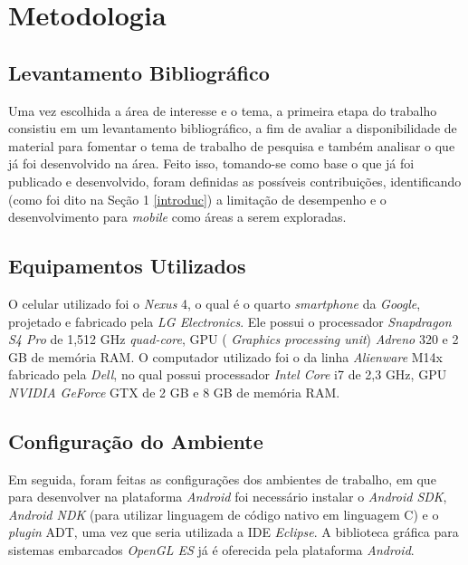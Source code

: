 \chapter[Metodologia]{Metodologia}

\section{Levantamento Bibliográfico}

Uma vez escolhida a área de interesse e o tema, a primeira etapa do trabalho consistiu em um levantamento bibliográfico, a fim de avaliar a disponibilidade de material para fomentar o tema de trabalho de pesquisa e também analisar o que já foi desenvolvido na área. Feito isso, tomando-se como base o que já foi publicado e desenvolvido, foram definidas as possíveis contribuições, identificando (como foi dito na Seção 1 \ref{introduc}) a limitação de desempenho e o desenvolvimento para \textit{mobile} como áreas a serem exploradas.  

\section{Equipamentos Utilizados}

O celular utilizado foi o \textit{Nexus} 4, o qual é o quarto  \textit{smartphone} da  \textit{Google}, projetado e fabricado pela \textit{LG Electronics}.  Ele possui o processador \textit{Snapdragon S4 Pro} de 1,512 GHz \textit{quad-core}, GPU ( \textit{Graphics processing unit}) \textit{Adreno} 320 e 2 GB de memória RAM. O computador utilizado foi o da linha \textit{Alienware} M14x fabricado pela \textit{Dell}, no qual possui processador \textit{Intel Core} i7 de 2,3 GHz, GPU \textit{NVIDIA GeForce} GTX de 2 GB e 8 GB de memória RAM. 

\section{Configuração do Ambiente}
\label{configamb}	

	Em seguida, foram feitas as configurações dos ambientes de trabalho, em que  para desenvolver na plataforma \textit{Android} foi necessário instalar o \textit{Android SDK}, \textit{Android NDK} (para utilizar linguagem de código nativo em linguagem C) e o \textit{plugin} ADT, uma vez que seria utilizada a IDE \textit{Eclipse}. A biblioteca gráfica para sistemas embarcados \textit{OpenGL ES} já é oferecida pela plataforma \textit{Android}. 


